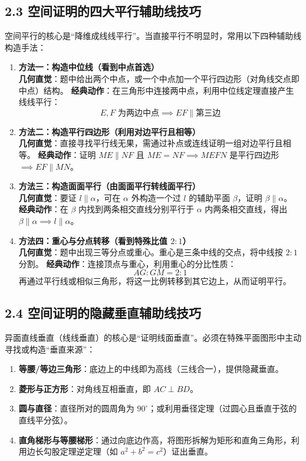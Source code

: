 \documentclass[11pt,a4paper]{ctexart}
\begin{document}
\subsection*{2.3 空间证明的四大平行辅助线技巧}

空间平行的核心是“降维成线线平行”。当直接平行不明显时，常用以下四种辅助线构造手法：
\begin{enumerate}
  \item \textbf{方法一：构造中位线（看到中点首选）} \\
    \textbf{几何直觉}：题中给出两个中点，或一个中点加一个平行四边形（对角线交点即中点）结构。
    \textbf{经典动作}：在三角形中连接两中点，利用中位线定理直接产生线线平行：
    \[ E, F \text{ 为两边中点} \implies EF \parallel \text{第三边} \]
  \item \textbf{方法二：构造平行四边形（利用对边平行且相等）} \\
    \textbf{几何直觉}：直接寻找平行线无果，需通过补点或连线证明一组对边平行且相等。
    \textbf{经典动作}：证明 $ME \parallel NF$ 且 $ME = NF \implies MEFN$ 是平行四边形 $\implies EF \parallel MN$。
  \item \textbf{方法三：构造面面平行（由面面平行转线面平行）} \\
    \textbf{几何直觉}：要证 $l \parallel \alpha$，可在 $\alpha$ 外构造一个过 $l$ 的辅助平面 $\beta$，证明 $\beta \parallel \alpha$。
    \textbf{经典动作}：在 $\beta$ 内找到两条相交直线分别平行于 $\alpha$ 内两条相交直线，得出 $\beta \parallel \alpha \implies l \parallel \alpha$。
  \item \textbf{方法四：重心与分点转移（看到特殊比值 $2:1$）} \\
    \textbf{几何直觉}：题中出现三等分点或重心。重心是三条中线的交点，将中线按 $2:1$ 分割。
    \textbf{经典动作}：连接顶点与重心，利用重心的分比性质：
    \[ AG : GM = 2 : 1 \]
    再通过平行线或相似三角形，将这一比例转移到其它边上，从而证明平行。
\end{enumerate}

\subsection*{2.4 空间证明的隐藏垂直辅助线技巧}

异面直线垂直（线线垂直）的核心是“证明线面垂直”。必须在特殊平面图形中主动寻找或构造“垂直来源”：
\begin{enumerate}
  \item \textbf{等腰/等边三角形}：底边上的中线即为高线（三线合一），提供隐藏垂直。
  \item \textbf{菱形与正方形}：对角线互相垂直，即 $AC \perp BD$。
  \item \textbf{圆与直径}：直径所对的圆周角为 $90^\circ$；或利用垂径定理（过圆心且垂直于弦的直线平分弦）。
  \item \textbf{直角梯形与等腰梯形}：通过向底边作高，将图形拆解为矩形和直角三角形，利用边长勾股定理逆定理（如 $a^2 + b^2 = c^2$）证出垂直。
\end{enumerate}
\end{document}
